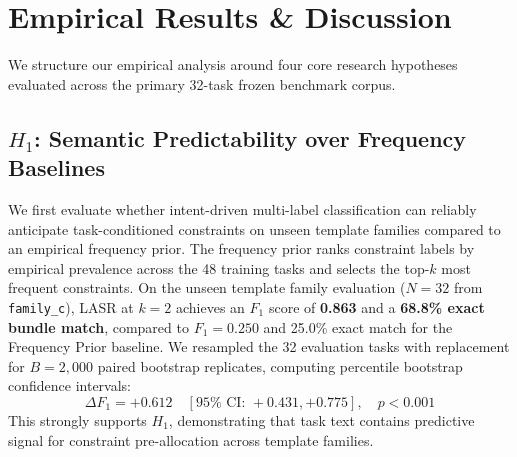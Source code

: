 \section{Empirical Results \& Discussion}
\label{sec:results}

We structure our empirical analysis around four core research hypotheses evaluated across the primary 32-task frozen benchmark corpus.

\subsection{$H_1$: Semantic Predictability over Frequency Baselines}
We first evaluate whether intent-driven multi-label classification can reliably anticipate task-conditioned constraints on unseen template families compared to an empirical frequency prior. The frequency prior ranks constraint labels by empirical prevalence across the 48 training tasks and selects the top-$k$ most frequent constraints.
On the unseen template family evaluation ($N=32$ from \texttt{family\_c}), LASR at $k=2$ achieves an $F_1$ score of \textbf{0.863} and a \textbf{68.8\% exact bundle match}, compared to \textbf{$F_1 = 0.250$} and 25.0\% exact match for the Frequency Prior baseline. We resampled the 32 evaluation tasks with replacement for $B=2,000$ paired bootstrap replicates, computing percentile bootstrap confidence intervals:
\begin{equation}
\Delta F_1 = +0.612 \quad [95\% \text{ CI: } +0.431, +0.775], \quad p < 0.001
\end{equation}
This strongly supports $H_1$, demonstrating that task text contains predictive signal for constraint pre-allocation across template families.




